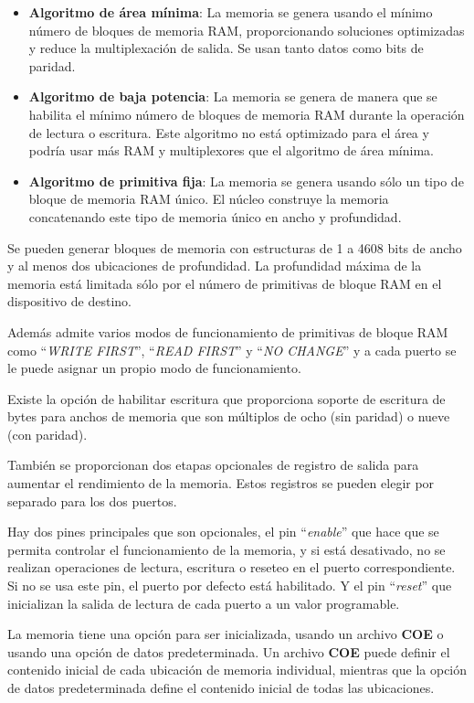 \begin{itemize}
    \item \textbf{Algoritmo de área mínima}: La memoria se genera usando el mínimo número de bloques de memoria RAM, proporcionando 
    soluciones optimizadas y reduce la multiplexación de salida. Se usan tanto datos como bits de paridad.
    \item \textbf{Algoritmo de baja potencia}: La memoria se genera de manera que se habilita el mínimo 
    número de bloques de memoria RAM durante la operación de lectura o escritura. Este algoritmo no está optimizado 
    para el área y podría usar más RAM y multiplexores que el algoritmo de área mínima.
    \item \textbf{Algoritmo de primitiva fija}: La memoria se genera usando sólo un tipo de bloque de memoria RAM único.
    El núcleo construye la memoria concatenando este tipo de memoria único en ancho y profundidad.
\end{itemize}

Se pueden generar bloques de memoria con estructuras de 1 a 4608 bits de ancho y al menos dos 
ubicaciones de profundidad. La profundidad máxima de la memoria está limitada sólo por el número de 
primitivas de bloque RAM en el dispositivo de destino. 

Además admite varios modos de funcionamiento de primitivas de bloque RAM como ``\textit{WRITE FIRST}'', 
``\textit{READ FIRST}'' y ``\textit{NO CHANGE}'' y a cada puerto se le puede asignar un propio modo de 
funcionamiento.

Existe la opción de habilitar escritura que proporciona soporte de escritura de bytes para anchos de memoria que 
son múltiplos de ocho (sin paridad) o nueve (con paridad).

También se proporcionan dos etapas opcionales de registro de salida para aumentar el rendimiento de la memoria. 
Estos registros se pueden elegir por separado para los dos puertos. 

Hay dos pines principales que son opcionales, el pin ``\textit{enable}'' que hace que se permita controlar 
el funcionamiento de la memoria, y si está desativado, no se realizan operaciones de lectura, escritura o 
reseteo en el puerto correspondiente. Si no se usa este pin, el puerto por defecto está habilitado. Y el 
pin ``\textit{reset}'' que inicializan la salida de lectura de cada puerto a un valor programable.

La memoria tiene una opción para ser inicializada, usando un archivo \textbf{COE} o usando una 
opción de datos predeterminada. Un archivo \textbf{COE} puede definir el contenido inicial de cada ubicación 
de memoria individual, mientras que la opción de datos predeterminada define el contenido inicial de todas 
las ubicaciones.

